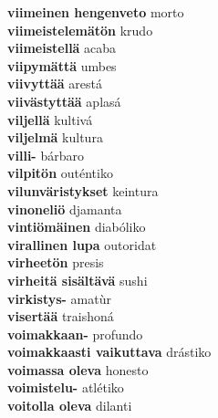 \textbf{ viimeinen hengenveto  } morto \\
\textbf{ viimeistelemätön  } krudo \\
\textbf{ viimeistellä  } acaba \\
\textbf{ viipymättä  } umbes \\
\textbf{ viivyttää  } arestá \\
\textbf{ viivästyttää  } aplasá \\
\textbf{ viljellä  } kultivá \\
\textbf{ viljelmä  } kultura \\
\textbf{ villi-  } bárbaro \\
\textbf{ vilpitön  } outéntiko \\
\textbf{ vilunväristykset  } keintura \\
\textbf{ vinoneliö  } djamanta \\
\textbf{ vintiömäinen  } diabóliko \\
\textbf{ virallinen lupa  } outoridat \\
\textbf{ virheetön  } presis \\
\textbf{ virheitä sisältävä  } sushi \\
\textbf{ virkistys-  } amatùr \\
\textbf{ visertää  } traishoná \\
\textbf{ voimakkaan-  } profundo \\
\textbf{ voimakkaasti vaikuttava  } drástiko \\
\textbf{ voimassa oleva  } honesto \\
\textbf{ voimistelu-  } atlétiko \\
\textbf{ voitolla oleva  } dilanti \\
